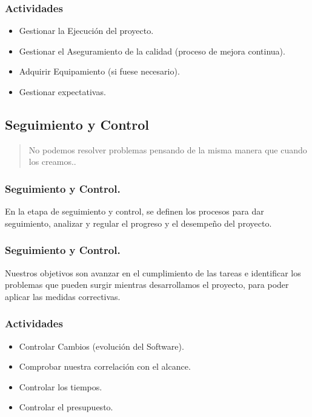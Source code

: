 \documentclass[12pt]{beamer}
\begin{document}
\begin{frame}
 \frametitle{Actividades}
 \begin{itemize}
  \item<2-> Gestionar la Ejecución del proyecto.
  \item<3-> Gestionar el Aseguramiento de la calidad (proceso de mejora continua).
  \item<4-> Adquirir Equipamiento (si fuese necesario).
  \item<5-> Gestionar expectativas.
 \end{itemize}
\end{frame}





\subsection{Seguimiento y Control}

\begin{frame}
 \begin{quote}
 No podemos resolver problemas pensando de la misma manera que cuando los creamos..
 \newline
 \newline
 \end{quote}
\end{frame}

\begin{frame}
 \frametitle{Seguimiento y Control.}
 En la etapa de seguimiento y control, se definen los procesos para dar seguimiento,
analizar y regular el progreso y el desempeño del proyecto.
\end{frame}


\begin{frame}
 \frametitle{Seguimiento y Control.}
  Nuestros objetivos son avanzar en el cumplimiento de las tareas e identificar los problemas que pueden
surgir mientras desarrollamos el proyecto, para poder aplicar las medidas correctivas.
\end{frame}


\begin{frame}
 \frametitle{Actividades}
 \begin{itemize}
  \item<2-> Controlar Cambios (evolución del Software).
  \item<3-> Comprobar nuestra correlación con el alcance.
  \item<4-> Controlar los tiempos.
  \item<5-> Controlar el presupuesto.
 \end{itemize}
\end{frame}
\end{document}
